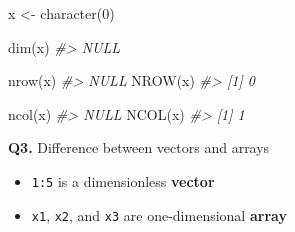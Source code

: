 \documentclass[
]{book}
\newenvironment{Shaded}{\begin{snugshade}}{\end{snugshade}}
\newcommand{\CommentTok}[1]{\textcolor[rgb]{0.56,0.35,0.01}{\textit{#1}}}
\newcommand{\DecValTok}[1]{\textcolor[rgb]{0.00,0.00,0.81}{#1}}
\newcommand{\FunctionTok}[1]{\textcolor[rgb]{0.00,0.00,0.00}{#1}}
\newcommand{\NormalTok}[1]{#1}
\newcommand{\OtherTok}[1]{\textcolor[rgb]{0.56,0.35,0.01}{#1}}
\providecommand{\tightlist}{%
  \setlength{\itemsep}{0pt}\setlength{\parskip}{0pt}}
\begin{document}
\begin{Shaded}
\begin{Highlighting}[]
\NormalTok{x }\OtherTok{\textless{}{-}} \FunctionTok{character}\NormalTok{(}\DecValTok{0}\NormalTok{)}

\FunctionTok{dim}\NormalTok{(x)}
\CommentTok{\#\textgreater{} NULL}

\FunctionTok{nrow}\NormalTok{(x)}
\CommentTok{\#\textgreater{} NULL}
\FunctionTok{NROW}\NormalTok{(x)}
\CommentTok{\#\textgreater{} [1] 0}

\FunctionTok{ncol}\NormalTok{(x)}
\CommentTok{\#\textgreater{} NULL}
\FunctionTok{NCOL}\NormalTok{(x)}
\CommentTok{\#\textgreater{} [1] 1}
\end{Highlighting}
\end{Shaded}

\textbf{Q3.} Difference between vectors and arrays

\begin{itemize}
\tightlist
\item
  \texttt{1:5} is a dimensionless \textbf{vector}
\item
  \texttt{x1}, \texttt{x2}, and \texttt{x3} are one-dimensional \textbf{array}
\end{itemize}
\end{document}
